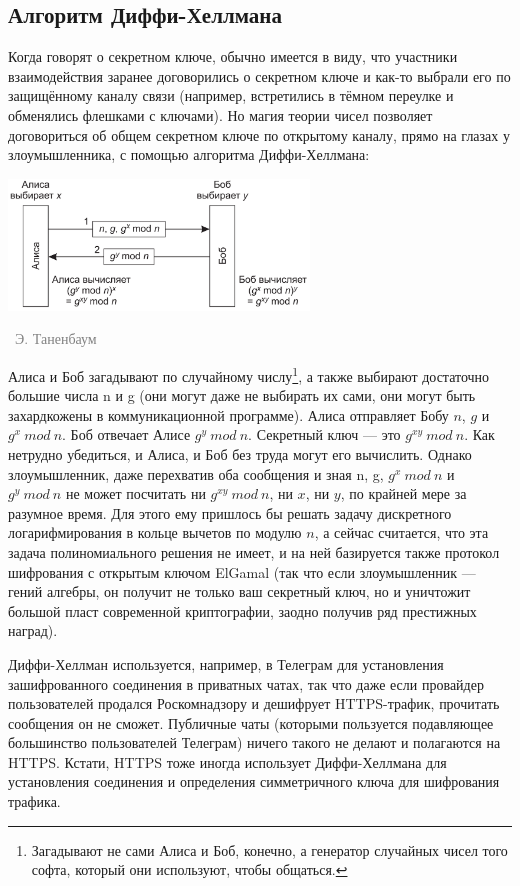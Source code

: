 \documentclass[a5paper]{article}
\newcommand{\attribution}[1] {
\vspace{-5mm}\begin{flushright}\begin{scriptsize}\textcolor{gray}{\textcopyright\, #1}\end{scriptsize}\end{flushright}
}
\begin{document}
\subsection{Алгоритм Диффи-Хеллмана}

Когда говорят о секретном ключе, обычно имеется в виду, что участники взаимодействия заранее договорились о секретном ключе и как-то выбрали его по защищённому каналу связи (например, встретились в тёмном переулке и обменялись флешками с ключами). Но магия теории чисел позволяет договориться об общем секретном ключе по открытому каналу, прямо на глазах у злоумышленника, с помощью алгоритма Диффи-Хеллмана:

\begin{center}
    \includegraphics[width=0.6\textwidth]{diffieHellman.png}
    \attribution{Э. Таненбаум}
\end{center}

Алиса и Боб загадывают по случайному числу\footnote{Загадывают не сами Алиса и Боб, конечно, а генератор случайных чисел того софта, который они используют, чтобы общаться.}, а также выбирают достаточно большие числа n и g (они могут даже не выбирать их сами, они могут быть захардкожены в коммуникационной программе). Алиса отправляет Бобу $n$, $g$ и $g^x\ mod\ n$. Боб отвечает Алисе $g^y\ mod\ n$. Секретный ключ --- это $g^{xy}\ mod\ n$. Как нетрудно убедиться, и Алиса, и Боб без труда могут его вычислить. Однако злоумышленник, даже перехватив оба сообщения и зная n, g, $g^x\ mod\ n$ и $g^y\ mod\ n$ не может посчитать ни $g^{xy}\ mod\ n$, ни $x$, ни $y$, по крайней мере за разумное время. Для этого ему пришлось бы решать задачу дискретного логарифмирования в кольце вычетов по модулю $n$, а сейчас считается, что эта задача полиномиального решения не имеет, и на ней базируется также протокол шифрования с открытым ключом ElGamal (так что если злоумышленник --- гений алгебры, он получит не только ваш секретный ключ, но и уничтожит большой пласт современной криптографии, заодно получив ряд престижных наград).

Диффи-Хеллман используется, например, в Телеграм для установления зашифрованного соединения в приватных чатах, так что даже если провайдер пользователей продался Роскомнадзору и дешифрует HTTPS-трафик, прочитать сообщения он не сможет. Публичные чаты (которыми пользуется подавляющее большинство пользователей Телеграм) ничего такого не делают и полагаются на HTTPS. Кстати, HTTPS тоже иногда использует Диффи-Хеллмана для установления соединения и определения симметричного ключа для шифрования трафика.
\end{document}
